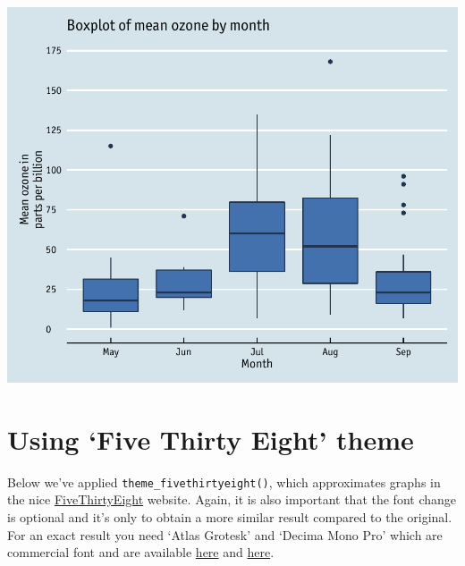 \documentclass[]{article}
\begin{document}
\begin{center}\includegraphics{10_Boxplots_pdf/box_12-1} \end{center}

\section{\texorpdfstring{Using `Five Thirty Eight'
theme}{Using Five Thirty Eight theme}}\label{using-five-thirty-eight-theme}

Below we've applied \texttt{theme\_fivethirtyeight()}, which
approximates graphs in the nice
\href{http://fivethirtyeight.com/}{FiveThirtyEight} website. Again, it
is also important that the font change is optional and it's only to
obtain a more similar result compared to the original. For an exact
result you need `Atlas Grotesk' and `Decima Mono Pro' which are
commercial font and are available
\href{https://commercialtype.com/catalog/atlas}{here} and
\href{https://www.myfonts.com/fonts/tipografiaramis/decima-mono-pro/}{here}.
\end{document}
